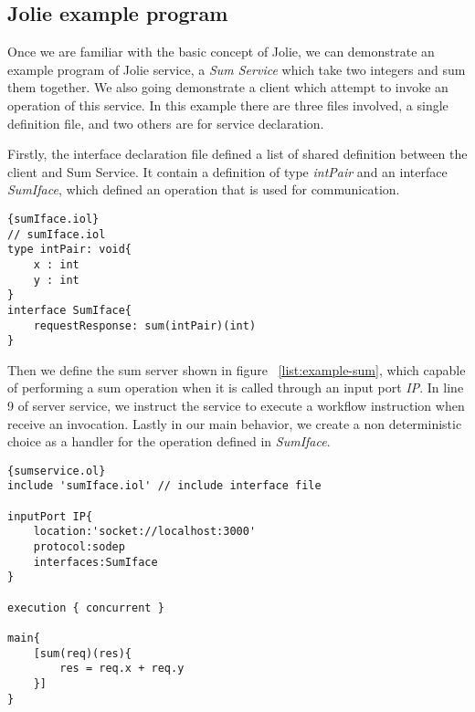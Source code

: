 \subsection{Jolie example program}

Once we are familiar with the basic concept of Jolie, we can demonstrate an example program of Jolie service, a \textit{Sum Service} which take two integers and sum them together. We also going demonstrate a client which attempt to invoke an operation of this service. In this example there are three files involved, a single definition file, and two others are for service declaration.

Firstly, the interface declaration file defined a list of shared definition between the client and Sum Service. It contain a definition of type \textit{intPair} and an interface \textit{SumIface}, which defined an operation that is used for communication.

\begin{listing}[ht]
    \lstset{language=Jolie,
        style=codeStyle
    }
    \begin{lstlisting}[frame=tlrb,caption={Sum service interface}, basicstyle=\footnotesize, label={list:example-iol}]{sumIface.iol}
// sumIface.iol
type intPair: void{
    x : int
    y : int
}
interface SumIface{
    requestResponse: sum(intPair)(int)
}
\end{lstlisting}
\end{listing}

Then we define the sum server shown in figure ~\ref{list:example-sum}, which capable of performing a sum operation when it is called through an input port \textit{IP}. In line 9 of server service, we instruct the service to execute a workflow instruction when receive an invocation. Lastly in our main behavior, we create a non deterministic choice as a handler for the operation defined in \textit{SumIface}.

\begin{listing}[ht]
    \lstset{language=Jolie,
        style=codeStyle,
        numbers=left,
        firstnumber=1
    }
    \begin{lstlisting}[frame=tlrb,basicstyle=\footnotesize, caption= {Sum service}, label={list:example-sum} ]{sumservice.ol}
include 'sumIface.iol' // include interface file

inputPort IP{
    location:'socket://localhost:3000'
    protocol:sodep 
    interfaces:SumIface
}

execution { concurrent }

main{
    [sum(req)(res){
        res = req.x + req.y
    }]
}
\end{lstlisting}
\end{listing}

